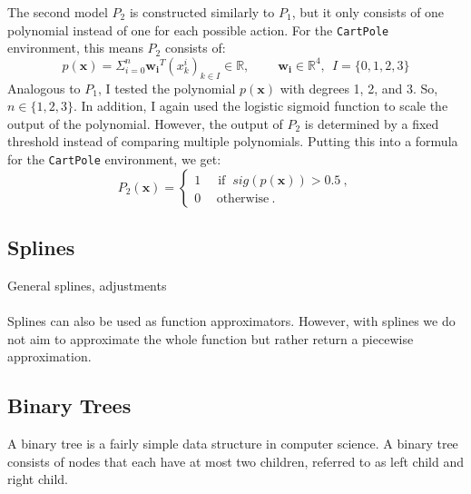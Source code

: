 The second model $P_2$ is constructed similarly to $P_1$, but it only consists of one polynomial instead of one for each possible action. For the \verb|CartPole| environment, this means $P_2$ consists of:
\[
  p(\mathbf{x}) = \Sigma_{i=0}^{n} \mathbf{w_i}^T (x_k^i)_{k \in I} \in \mathbb{R}, \ \ \ \ \ \ \ \ \ \ \mathbf{w_i} \in \mathbb{R}^4, \ \ I = \{0, 1, 2, 3\}
\]
Analogous to $P_1$, I tested the polynomial $p(\mathbf{x})$ with degrees 1, 2, and 3. So, $n \in \{1, 2, 3\}$. In addition, I again used the logistic sigmoid function to scale the output of the polynomial. However, the output of $P_2$ is determined by a fixed threshold instead of comparing multiple polynomials. Putting this into a formula for the \verb|CartPole| environment, we get:
\[
  P_2(\mathbf{x}) =
  \begin{cases}1~&{\text{ if }}~sig(p(\mathbf{x}))>0.5~,\\0~&~\text{otherwise}~.\end{cases}
\]


\subsection{Splines}
General splines, adjustments \\ \\
Splines can also be used as function approximators. However, with splines we do not aim to approximate the whole function but rather return a piecewise approximation.



\subsection{Binary Trees}
A binary tree is a fairly simple data structure in computer science. A binary tree consists of nodes that each have at most two children, referred to as left child and right child.
